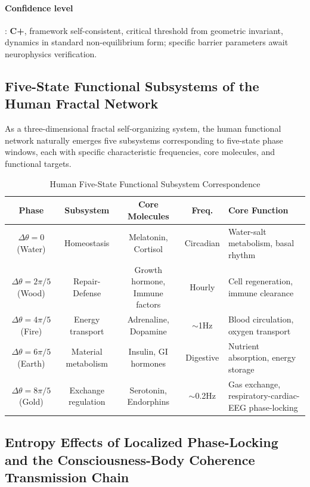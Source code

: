 \documentclass[12pt,a4paper,twocolumn]{article}
\begin{document}
\paragraph{Confidence level}: \textbf{C+}, framework self-consistent, critical threshold from geometric invariant, dynamics in standard non-equilibrium form; specific barrier parameters await neurophysics verification.


\subsection{Five-State Functional Subsystems of the Human Fractal Network}
\label{subsec:five_subsystems}
As a three-dimensional fractal self-organizing system, the human functional network naturally emerges five subsystems corresponding to five-state phase windows, each with specific characteristic frequencies, core molecules, and functional targets.

\begin{table}[H]
\centering
\footnotesize
\caption{Human Five-State Functional Subsystem Correspondence}
\begin{tabular}{c|c|c|c|p{4cm}}
\hline
\textbf{Phase} & \textbf{Subsystem} & \textbf{Core Molecules} & \textbf{Freq.} & \textbf{Core Function} \\
\hline
$\Delta\theta=0$ (Water) & Homeostasis & Melatonin, Cortisol & Circadian & Water-salt metabolism, basal rhythm \\
$\Delta\theta=2\pi/5$ (Wood) & Repair-Defense & Growth hormone, Immune factors & Hourly & Cell regeneration, immune clearance \\
$\Delta\theta=4\pi/5$ (Fire) & Energy transport & Adrenaline, Dopamine & $\sim$1Hz & Blood circulation, oxygen transport \\
$\Delta\theta=6\pi/5$ (Earth) & Material metabolism & Insulin, GI hormones & Digestive & Nutrient absorption, energy storage \\
$\Delta\theta=8\pi/5$ (Gold) & Exchange regulation & Serotonin, Endorphins & $\sim$0.2Hz & Gas exchange, respiratory-cardiac-EEG phase-locking \\
\hline
\end{tabular}
\end{table}


\subsection{Entropy Effects of Localized Phase-Locking and the Consciousness-Body Coherence Transmission Chain}
\label{subsec:coherence_link}
\end{document}
